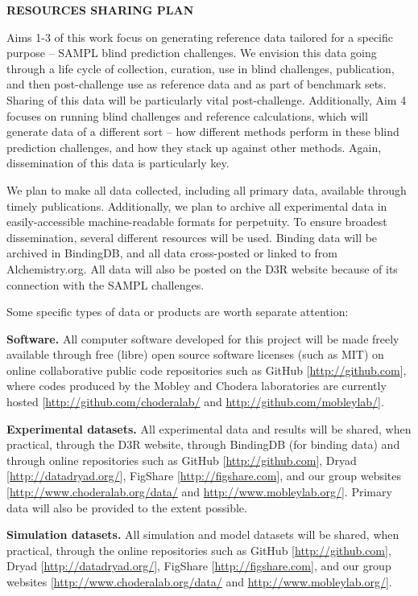 \documentclass[11pt]{article}
\begin{document}

{\bf RESOURCES SHARING PLAN}

Aims 1-3 of this work focus on generating reference data tailored for a specific purpose -- SAMPL blind prediction challenges. 
We envision this data going through a life cycle of collection, curation, use in blind challenges, publication, and then post-challenge use as reference data and as part of benchmark sets. 
Sharing of this data will be particularly vital post-challenge. 
Additionally, Aim 4 focuses on running blind challenges and reference calculations, which will generate data of a different sort -- how different methods perform in these blind prediction challenges, and how they stack up against other methods. 
Again, dissemination of this data is particularly key. 

We plan to make all data collected, including all primary data, available through timely publications.
Additionally, we plan to archive all experimental data in easily-accessible machine-readable formats for perpetuity.
To ensure broadest dissemination, several different resources will be used. 
Binding data will be archived in BindingDB, and all data cross-posted or linked to from Alchemistry.org. 
All data will also be posted on the D3R website because of its connection with the SAMPL challenges. 

Some specific types of data or products are worth separate attention:

{\bf Software.} All computer software developed for this project will be made freely available through free (libre) open source software licenses (such as MIT) on online collaborative public code repositories such as GitHub [\url{http://github.com}], where codes produced by the Mobley and Chodera laboratories are currently hosted [\url{http://github.com/choderalab/} and \url{http://github.com/mobleylab/}].

{\bf Experimental datasets.} All experimental data and results will be shared, when practical, through the D3R website, through BindingDB (for binding data) and through online repositories such as GitHub [\url{http://github.com}], Dryad [\url{http://datadryad.org/}], FigShare [\url{http://figshare.com}], and our group websites [\url{http://www.choderalab.org/data/} and \url{http://www.mobleylab.org/}]. Primary data will also be provided to the extent possible.

{\bf Simulation datasets.} All simulation and model datasets will be shared, when practical, through the online repositories such as GitHub [\url{http://github.com}], Dryad [\url{http://datadryad.org/}], FigShare [\url{http://figshare.com}], and our group websites [\url{http://www.choderalab.org/data/} and \url{http://www.mobleylab.org/}]. 
\end{document}
